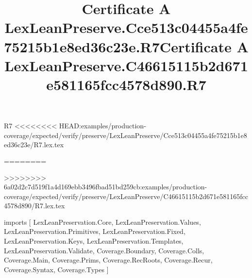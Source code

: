 \begin{lexlean}{R7}
<<<<<<<< HEAD:examples/production-coverage/expected/verify/preserve/LexLeanPreserve/Cce513c04455a4fe75215b1e8ed36c23e/R7.lex.tex
\title{Certificate A LexLeanPreserve.Cce513c04455a4fe75215b1e8ed36c23e.R7}
========
\title{Certificate A LexLeanPreserve.C46615115b2d671e581165fcc4578d890.R7}
>>>>>>>> 6a02d2c7d519f1a4d169ebb3496fbad51bd259cb:examples/production-coverage/expected/verify/preserve/LexLeanPreserve/C46615115b2d671e581165fcc4578d890/R7.lex.tex
\begin{coremodule}
imports [
  LexLeanPreservation.Core,
  LexLeanPreservation.Values,
  LexLeanPreservation.Primitives,
  LexLeanPreservation.Fixed,
  LexLeanPreservation.Keys,
  LexLeanPreservation.Templates,
  LexLeanPreservation.Validate,
  Coverage.Boundary,
  Coverage.Colls,
  Coverage.Main,
  Coverage.Prims,
  Coverage.RecRoots,
  Coverage.Recur,
  Coverage.Syntax,
  Coverage.Types
]


\end{coremodule}
\end{lexlean}
